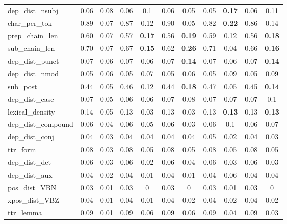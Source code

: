 \documentclass[a4paper, nobind]{templates/ociamthesis}
\begin{document}
\begin{table}
\begin{tabular}[t]{lccccc>{}c|cccc}
dep\_dist\_nsubj & 0.06 & 0.08 & 0.06 & 0.1 & 0.06 & 0.05 & 0.05 & \textbf{0.17} & 0.06 & 0.11\\
char\_per\_tok & 0.89 & 0.07 & 0.87 & 0.12 & 0.90 & 0.05 & 0.82 & \textbf{0.22} & 0.86 & 0.14\\
prep\_chain\_len & 0.60 & 0.07 & 0.57 & \textbf{0.17} & 0.56 & \textbf{0.19} & 0.59 & 0.12 & 0.56 & \textbf{0.18}\\
sub\_chain\_len & 0.70 & 0.07 & 0.67 & \textbf{0.15} & 0.62 & \textbf{0.26} & 0.71 & 0.04 & 0.66 & \textbf{0.16}\\
dep\_dist\_punct & 0.07 & 0.06 & 0.07 & 0.06 & 0.07 & \textbf{0.14} & 0.07 & 0.06 & 0.07 & \textbf{0.14}\\
dep\_dist\_nmod & 0.05 & 0.06 & 0.05 & 0.07 & 0.05 & 0.06 & 0.05 & 0.09 & 0.05 & 0.09\\
sub\_post & 0.44 & 0.05 & 0.46 & 0.12 & 0.44 & \textbf{0.18} & 0.47 & 0.05 & 0.45 & \textbf{0.14}\\
dep\_dist\_case & 0.07 & 0.05 & 0.06 & 0.06 & 0.07 & 0.08 & 0.07 & 0.07 & 0.07 & 0.1\\
lexical\_density & 0.14 & 0.05 & 0.13 & 0.03 & 0.13 & 0.03 & 0.13 & \textbf{0.13} & 0.13 & \textbf{0.13}\\
dep\_dist\_compound & 0.06 & 0.04 & 0.06 & 0.05 & 0.06 & 0.03 & 0.06 & 0.1 & 0.06 & 0.07\\
dep\_dist\_conj & 0.04 & 0.03 & 0.04 & 0.04 & 0.04 & 0.04 & 0.05 & 0.02 & 0.04 & 0.03\\
ttr\_form & 0.08 & 0.03 & 0.08 & 0.05 & 0.08 & 0.05 & 0.08 & 0.05 & 0.08 & 0.05\\
dep\_dist\_det & 0.06 & 0.03 & 0.06 & 0.02 & 0.06 & 0.04 & 0.06 & 0.03 & 0.06 & 0.03\\
dep\_dist\_aux & 0.04 & 0.02 & 0.04 & 0.01 & 0.04 & 0.01 & 0.04 & 0.06 & 0.04 & 0.04\\
pos\_dist\_VBN & 0.03 & 0.01 & 0.03 & 0 & 0.03 & 0 & 0.03 & 0.01 & 0.03 & 0\\
xpos\_dist\_VBZ & 0.04 & 0.01 & 0.04 & 0.01 & 0.04 & 0.02 & 0.04 & 0.02 & 0.04 & 0.02\\
ttr\_lemma & 0.09 & 0.01 & 0.09 & 0.06 & 0.09 & 0.06 & 0.09 & 0.04 & 0.09 & 0.03\\
\bottomrule
\end{tabular}
\end{table}
\end{document}
